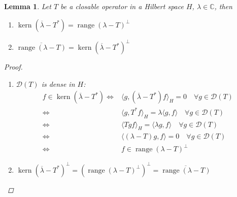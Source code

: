 \documentclass[12pt]{extreport} %
\newcommand{\C}{\mathbb{C}}
\newcommand{\DO}[1]{\mathcal{D}\left( {#1} \right)}
\theoremstyle{named}
\theoremstyle{nnamed}
\theoremstyle{itshape}
\newtheorem{lemma}{Lemma}  \counterwithin{lemma}{chapter}
\theoremstyle{normal}
\begin{document}
\begin{lemma}
	Let $T$ be a closable operator in a Hilbert space $H$, $\lambda \in \C$, then
	\begin{enumerate}
		\item $\operatorname{kern} \left( \overline{\lambda} - T^* \right) = \operatorname{range} \left( \lambda - T \right)^\perp$
		\item $\overline{\operatorname{range}(\lambda - T)} = \operatorname{kern} (\overline{\lambda} - T^*)^\perp$
	\end{enumerate}
	
	\begin{proof} ~\
		\begin{enumerate}
			\item $\DO{T}$ is dense in $H$: 
				\begin{align*}
					f \in \operatorname{kern}(\overline{\lambda} - T^*) \iff & \langle g , \left( \overline{\lambda} - T^* \right) f \rangle_H = 0 \quad \forall g \in \DO{T} \\
						\iff & \langle g , T^* f \rangle_H = \lambda \langle g, f \rangle \quad \forall g \in \DO{T} \\
						\iff & \langle T g  f \rangle_H = \langle \lambda g, f \rangle \quad \forall g \in \DO{T} \\
						\iff & \langle \left( \lambda - T \right) g , f \rangle = 0 \quad \forall g \in \DO{T} \\
						\iff & f \in \operatorname{range}(\lambda - T)^\perp
				\end{align*}
			\item $\operatorname{kern} \left( \overline{\lambda} - T^* \right)^\perp = \left( \operatorname{range} \left( \lambda - T \right)^\perp \right)^\perp = \overline{ \operatorname{range} \left( \lambda - T \right)}$
		\end{enumerate}
	\end{proof}
\end{lemma}
\end{document}
